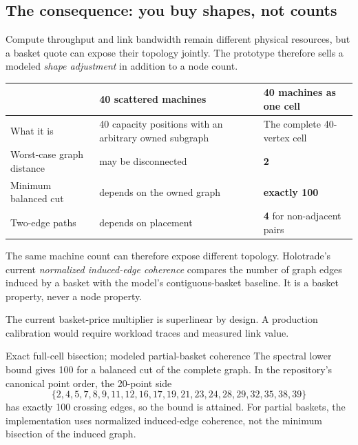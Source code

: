 \documentclass[11pt,letterpaper]{article}
\newcommand{\tagbox}[3]{\tikz[baseline=(X.base)]{\node[inner xsep=3.5pt,inner ysep=1.4pt,rounded corners=1.6pt,fill=#1,text=#2,font=\bfseries\sffamily\tiny] (X) {#3};}}
\newcommand{\PROVED}{\tagbox{greenlite}{green!45!black}{PROVED}}
\newcommand{\MODELLED}{\tagbox{amberlite}{amber!55!black}{MODELLED}}
\begin{document}
\subsection{The consequence: you buy shapes, not counts}

Compute throughput and link bandwidth remain different physical resources, but
a basket quote can expose their topology jointly. The prototype therefore sells
a modeled \emph{shape adjustment} in addition to a node count.

\begin{center}
\renewcommand{\arraystretch}{1.4}
\begin{tabular}{@{}p{} p{} p{}@{}}
\toprule
& \textbf{40 scattered machines} & \textbf{40 machines as one cell} \\
\midrule
What it is & 40 capacity positions with an arbitrary owned subgraph &
The complete 40-vertex cell\\
Worst-case graph distance & may be disconnected & \textbf{2}\\
Minimum balanced cut & depends on the owned graph & \textbf{exactly 100}\\
Two-edge paths & depends on placement & \textbf{4} for non-adjacent pairs\\
\bottomrule
\end{tabular}
\end{center}

The same machine count can therefore expose different topology. Holotrade's
current \emph{normalized induced-edge coherence} compares the number of graph
edges induced by a basket with the model's contiguous-basket baseline. It is a
basket property, never a node property.

The current basket-price multiplier is superlinear by design. \MODELLED{} A
production calibration would require workload traces and measured link value.

\begin{resultbox}{Exact full-cell bisection; modeled partial-basket coherence}
The spectral lower bound gives 100 for a balanced cut of the complete graph. In
the repository's canonical point order, the 20-point side
\[
\{2,4,5,7,8,9,11,12,16,17,19,21,23,24,28,29,32,35,38,39\}
\]
has exactly 100 crossing edges, so the bound is attained. \PROVED{}
For partial baskets, the implementation uses normalized induced-edge coherence,
not the minimum bisection of the induced graph. \MODELLED
\end{resultbox}
\end{document}
